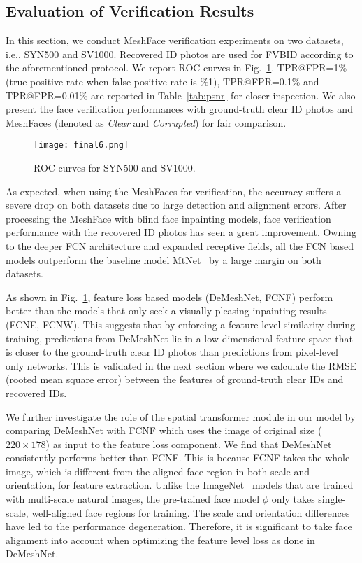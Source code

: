 \documentclass[10pt,twocolumn,letterpaper]{article}
\begin{document}
\subsection{Evaluation of Verification Results}

In this section, we conduct MeshFace verification experiments on two datasets, i.e., SYN500 and SV1000. Recovered ID photos are used for FVBID according to the aforementioned protocol.
We report ROC curves in Fig.~\ref{fig:roc}. TPR@FPR=1\% (true positive rate when false positive rate is \%1), TPR@FPR=0.1\% and TPR@FPR=0.01\% are reported in Table~\ref{tab:psnr} for closer inspection. We also present the face verification performances with ground-truth clear ID photos and MeshFaces (denoted as \textit{Clear} and \textit{Corrupted}) for fair comparison.
\begin{figure}
  \centering
    \texttt{[image: final6.png]}
    \caption{ROC curves for SYN500 and SV1000.}
    \label{fig:roc} %
\end{figure}


As expected, when using the MeshFaces for verification, the accuracy suffers a severe drop on both datasets due to large detection and alignment errors. After processing the MeshFace with blind face inpainting models, face verification performance with the recovered ID photos has seen a great improvement. Owning to the deeper FCN architecture and expanded receptive fields, all the FCN based models outperform the baseline model MtNet~\cite{7550058} by a large margin on both datasets.

As shown in Fig.~\ref{fig:roc}, feature loss based models (DeMeshNet, FCNF) perform better than the models that only seek a visually pleasing inpainting results (FCNE, FCNW). This suggests that by enforcing a feature level similarity during training, predictions from DeMeshNet lie in a low-dimensional feature space that is closer to the ground-truth clear ID photos than predictions from pixel-level only networks. This is validated in the next section where we calculate the RMSE (rooted mean square error) between the features of ground-truth clear IDs and recovered IDs.



We further investigate the role of the spatial transformer module in our model by comparing DeMeshNet with FCNF which uses the image of original size ($220\times 178$) as input to the feature loss component.
We find that DeMeshNet consistently performs better than FCNF. This is because FCNF takes the whole image, which is different from the aligned face region in both scale and orientation, for feature extraction. Unlike the ImageNet~\cite{russakovsky2015imagenet} models that are trained with multi-scale natural images, the pre-trained face model $\phi$ only takes single-scale, well-aligned face regions for training. The scale and orientation differences have led to the performance degeneration. Therefore, it is significant to take face alignment into account when optimizing the feature level loss as done in DeMeshNet.
\end{document}
